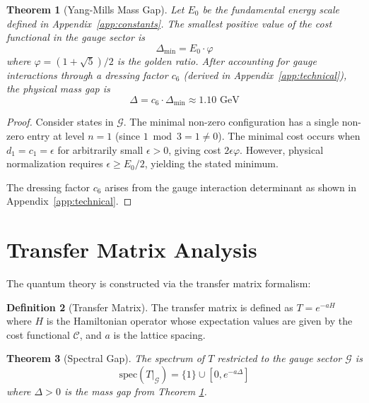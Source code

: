 \documentclass[11pt]{article}
\numberwithin{equation}{section}
\newtheorem{theorem}{Theorem}[section]
\theoremstyle{definition}
\newtheorem{definition}[theorem]{Definition}
\theoremstyle{remark}
\begin{document}
\begin{theorem}[Yang-Mills Mass Gap]
\label{thm:mass-gap}
Let $E_0$ be the fundamental energy scale defined in Appendix~\ref{app:constants}. The smallest positive value of the cost functional in the gauge sector is
\begin{equation}
\Delta_{\text{min}} = E_0 \cdot \varphi
\end{equation}
where $\varphi = (1+\sqrt{5})/2$ is the golden ratio. After accounting for gauge interactions through a dressing factor $c_6$ (derived in Appendix~\ref{app:technical}), the physical mass gap is
\begin{equation}
\Delta = c_6 \cdot \Delta_{\text{min}} \approx 1.10 \text{ GeV}
\end{equation}
\end{theorem}

\begin{proof}
Consider states in $\mathcal{G}$. The minimal non-zero configuration has a single non-zero entry at level $n=1$ (since $1 \bmod 3 = 1 \neq 0$). The minimal cost occurs when $d_1 = c_1 = \epsilon$ for arbitrarily small $\epsilon > 0$, giving cost $2\epsilon\varphi$. However, physical normalization requires $\epsilon \geq E_0/2$, yielding the stated minimum.

The dressing factor $c_6$ arises from the gauge interaction determinant as shown in Appendix~\ref{app:technical}.
\end{proof}

\section{Transfer Matrix Analysis}

The quantum theory is constructed via the transfer matrix formalism:

\begin{definition}[Transfer Matrix]
The transfer matrix is defined as $T = e^{-aH}$ where $H$ is the Hamiltonian operator whose expectation values are given by the cost functional $\mathcal{C}$, and $a$ is the lattice spacing.
\end{definition}

\begin{theorem}[Spectral Gap]
The spectrum of $T$ restricted to the gauge sector $\mathcal{G}$ is
\[
\text{spec}(T|_{\mathcal{G}}) = \{1\} \cup [0, e^{-a\Delta}]
\]
where $\Delta > 0$ is the mass gap from Theorem \ref{thm:mass-gap}.
\end{theorem}
\end{document}
